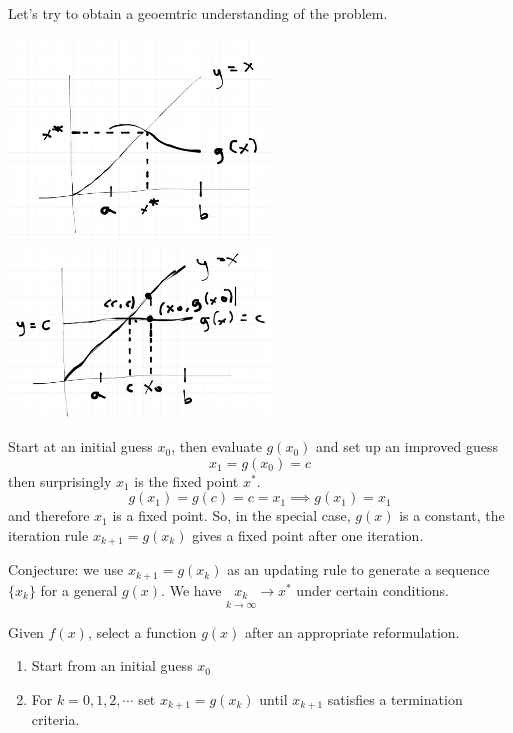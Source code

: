 \documentclass[12pt]{scrartcl}
\begin{document}
\begin{note}
  Let's try to obtain a geoemtric understanding of the problem.

  \begin{center}
    \includegraphics[width=7cm]{geo.png}
    \includegraphics[width=7cm]{gconstant.png}
  \end{center}

  Start at an initial guess $x_0$, then evaluate $g(x_0)$ and set up an improved guess 
  \[x_1 = g(x_0) = c\]
  then surprisingly $x_1$ is the fixed point $x^*$.
  \[g(x_1) = g(c) = c = x_1 \implies g(x_1) = x_1\]
  and therefore $x_1$ is a fixed point. So, in the special case, $g(x)$ is a constant, 
  the iteration rule $x_{k+1} = g(x_k)$ gives a fixed point after one iteration. 
\end{note}

\begin{note}
  Conjecture: we use $x_{k+1} = g(x_k)$ as an updating rule to generate a sequence $\{x_k\}$ for a general 
  $g(x)$. We have $\underset{k\to\infty}{x_k} \to x^*$ under certain conditions.
\end{note}

\begin{definition}
  Given $f(x)$, select a function $g(x)$ after an appropriate reformulation.

  \begin{enumerate}
    \item Start from an initial guess $x_0$
    \item For $k = 0, 1, 2, \cdots$ set $x_{k+1} = g(x_k)$ until $x_{k+1}$ satisfies a termination criteria.
  \end{enumerate}
\end{definition}
\end{document}
